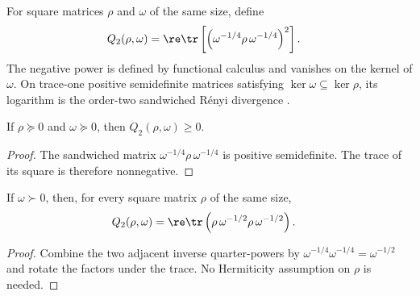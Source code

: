 \begin{definition}
    \label{def:sandwiched_renyi_two_trace}
    \leanok
    For square matrices $\rho$ and $\omega$ of the same size, define
    \begin{align}
        Q_2(\rho,\omega)
         & =\re\tr\left[
            \left(\omega^{-1/4}\rho\,\omega^{-1/4}\right)^2
            \right].
        \label{eq:mpdo_sandwiched_two_trace}
    \end{align}
    The negative power is defined by functional calculus and vanishes on the
    kernel of $\omega$. On trace-one positive semidefinite matrices satisfying
    $\ker\omega\subseteq\ker\rho$, its logarithm is the order-two sandwiched
    R\'enyi divergence \cite[Definition~2]{MullerLennert2013Renyi}.
\end{definition}

\begin{theorem}
    \label{thm:sandwiched_renyi_two_nonneg}
    \leanok
    If $\rho\succeq0$ and $\omega\succeq0$, then
    $Q_2(\rho,\omega)\geq0$.
\end{theorem}

\begin{proof}\leanok
    The sandwiched matrix
    $\omega^{-1/4}\rho\,\omega^{-1/4}$ is positive semidefinite. The trace of
    its square is therefore nonnegative.
\end{proof}

\begin{theorem}
    \label{thm:sandwiched_renyi_two_weighted}
    \leanok
    If $\omega\succ0$, then, for every square matrix $\rho$ of the same size,
    \begin{align}
        Q_2(\rho,\omega)
         & =\re\tr\left(\rho\,\omega^{-1/2}
        \rho\,\omega^{-1/2}\right).
        \label{eq:mpdo_sandwiched_two_weighted}
    \end{align}
\end{theorem}

\begin{proof}\leanok
    Combine the two adjacent inverse quarter-powers by
    $\omega^{-1/4}\omega^{-1/4}=\omega^{-1/2}$ and rotate the factors under
    the trace. No Hermiticity assumption on $\rho$ is needed.
\end{proof}

